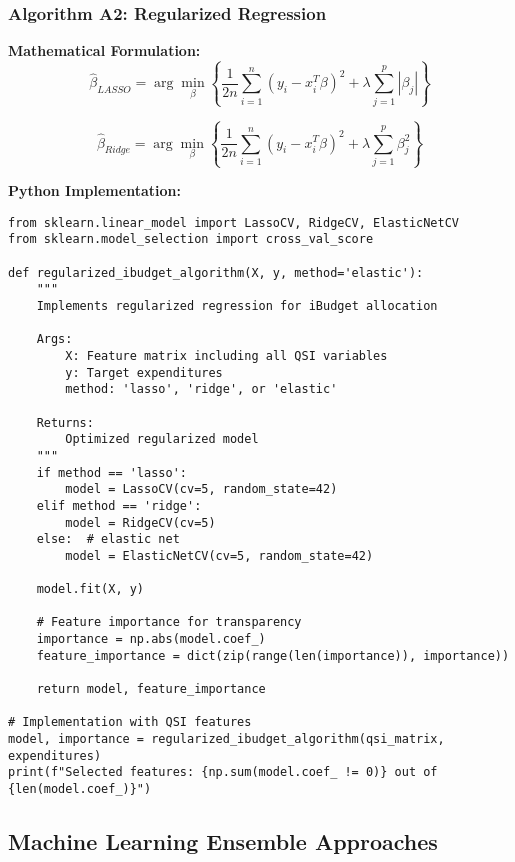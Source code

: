 \documentclass[12pt]{article}
\begin{document}
\subsubsection{Algorithm A2: Regularized Regression}

\textbf{Mathematical Formulation:}
\begin{equation}
\hat{\beta}_{LASSO} = \arg\min_{\beta} \left\{\frac{1}{2n}\sum_{i=1}^{n}(y_i - x_i^T\beta)^2 + \lambda\sum_{j=1}^{p}|\beta_j|\right\}
\end{equation}

\begin{equation}
\hat{\beta}_{Ridge} = \arg\min_{\beta} \left\{\frac{1}{2n}\sum_{i=1}^{n}(y_i - x_i^T\beta)^2 + \lambda\sum_{j=1}^{p}\beta_j^2\right\}
\end{equation}

\textbf{Python Implementation:}
\begin{lstlisting}
from sklearn.linear_model import LassoCV, RidgeCV, ElasticNetCV
from sklearn.model_selection import cross_val_score

def regularized_ibudget_algorithm(X, y, method='elastic'):
    """
    Implements regularized regression for iBudget allocation
    
    Args:
        X: Feature matrix including all QSI variables
        y: Target expenditures
        method: 'lasso', 'ridge', or 'elastic'
    
    Returns:
        Optimized regularized model
    """
    if method == 'lasso':
        model = LassoCV(cv=5, random_state=42)
    elif method == 'ridge':
        model = RidgeCV(cv=5)
    else:  # elastic net
        model = ElasticNetCV(cv=5, random_state=42)
    
    model.fit(X, y)
    
    # Feature importance for transparency
    importance = np.abs(model.coef_)
    feature_importance = dict(zip(range(len(importance)), importance))
    
    return model, feature_importance

# Implementation with QSI features
model, importance = regularized_ibudget_algorithm(qsi_matrix, expenditures)
print(f"Selected features: {np.sum(model.coef_ != 0)} out of {len(model.coef_)}")
\end{lstlisting}

\subsection{Machine Learning Ensemble Approaches}
\end{document}
